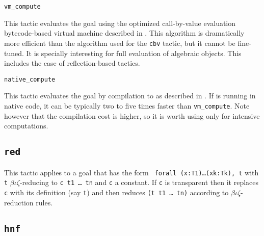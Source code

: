 \begin{coq_example*}
\begin{Variants}
\item {\tt vm\_compute} 

  This tactic evaluates the goal using the optimized call-by-value evaluation
  bytecode-based virtual machine described in
  \cite{CompiledStrongReduction}. This algorithm is dramatically more efficient
  than the algorithm used for the {\tt cbv} tactic, but it cannot be
  fine-tuned. It is specially interesting for full evaluation of algebraic
  objects. This includes the case of reflection-based tactics.

\item {\tt native\_compute} 

  This tactic evaluates the goal by compilation to \ocaml{} as described in
  \cite{FullReduction}. If \Coq{} is running in native code, it can be typically
  two to five times faster than {\tt vm\_compute}. Note however that the
  compilation cost is higher, so it is worth using only for intensive
  computations.

\end{Variants}

%


\subsection{\tt red}

This tactic applies to a goal that has the form {\tt
  forall (x:T1)\dots(xk:Tk), t} with {\tt t}
$\beta\iota\zeta$-reducing to {\tt c t1 \dots\ tn} and {\tt c} a
constant.  If
{\tt c} is transparent then it replaces {\tt c} with its definition
(say {\tt t}) and then reduces {\tt (t t1 \dots\ tn)} according to
$\beta\iota\zeta$-reduction rules.

\begin{ErrMsgs}
\item {}
\end{ErrMsgs}

\subsection{\tt hnf}


\end{coq_example*}
